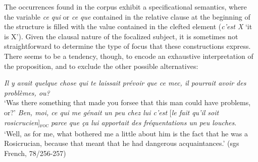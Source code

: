 The occurrences found in the corpus exhibit a specificational semantics, where the variable \textit{ce qui} or \textit{ce que} contained in the relative clause at the beginning of the structure is filled with the value contained in the clefted element (\textit{c'est X} `it is X'). Given the clausal nature of the focalized subject, it is sometimes not straightforward to determine the type of focus that these constructions express. There seems to be a tendency, though, to encode an exhaustive interpretation of the proposition, and to exclude the other possible alternatives:

 \ea  \label{ex:5:86}
\ea \textit{Il y avait quelque chose qui te laissait prévoir que ce mec, il pourrait avoir des problèmes, ou?} \\
 `Was there something that made you forsee that this man could have problems, or?'
\ex \textit{Ben, moi, ce qui me génait un peu chez lui c'est} {[\textit{le fait qu'il soit rosicrucien}]\textsubscript{\textsc{foc}}} \normalsize \textit{parce que ça lui apportait des fréquentations un peu louches}.\\
‘Well, as for me, what bothered me a little about him is the fact that he was a Rosicrucian, because that meant that he had dangerous acquaintances.' \hfill (sgs French, 78/256-257)   
\z \z 


